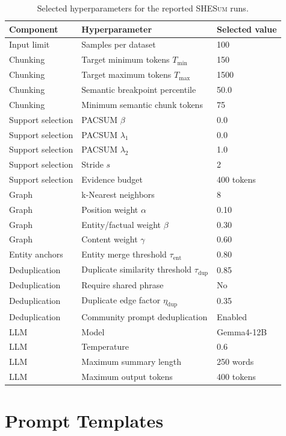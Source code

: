 \documentclass[11pt]{article}
\newcommand{\methodname}{\textsc{SHESum}}
\begin{document}
\begin{table}[t]
\centering
\small
\begin{tabular}{lll}
\toprule
Component & Hyperparameter & Selected value \\
\midrule
Input limit & Samples per dataset & 100 \\
Chunking & Target minimum tokens $T_{\min}$ & 150 \\
Chunking & Target maximum tokens $T_{\max}$ & 1500 \\
Chunking & Semantic breakpoint percentile & 50.0 \\
Chunking & Minimum semantic chunk tokens & 75 \\
Support selection & PACSUM $\beta$ & 0.0 \\
Support selection & PACSUM $\lambda_1$ & 0.0 \\
Support selection & PACSUM $\lambda_2$ & 1.0 \\
Support selection & Stride $s$ & 2 \\
Support selection & Evidence budget & 400 tokens \\
Graph & k-Nearest neighbors & 8 \\
Graph & Position weight $\alpha$ & 0.10 \\
Graph & Entity/factual weight $\beta$ & 0.30 \\
Graph & Content weight $\gamma$ & 0.60 \\
Entity anchors & Entity merge threshold $\tau_{\mathrm{ent}}$ & 0.80 \\
Deduplication & Duplicate similarity threshold $\tau_{\mathrm{dup}}$ & 0.85 \\
Deduplication & Require shared phrase & No \\
Deduplication & Duplicate edge factor $\eta_{\mathrm{dup}}$ & 0.35 \\
Deduplication & Community prompt deduplication & Enabled \\
LLM & Model & Gemma4-12B \\
LLM & Temperature & 0.6 \\
LLM & Maximum summary length & 250 words \\
LLM & Maximum output tokens & 400 tokens \\
\bottomrule
\end{tabular}
\caption{Selected hyperparameters for the reported \methodname{} runs.}
\label{tab:appendix-hyperparams}
\end{table}

\section{Prompt Templates}
\label{app:prompts}
\end{document}
